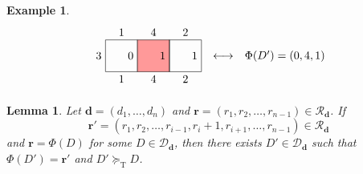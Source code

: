 \documentclass[10pt,a4paper]{amsart}
\newtheorem{lemma}{Lemma}
\newtheorem{example}{Example}
\newcommand{\geqt}{\succeq_{\text{T}}}
\begin{document}
\begin{example}
\[\begin{array}{ccc}
\begin{tikzpicture}[scale=.5]
      \draw (0,0) rectangle (2,2);
      \draw[fill=red!40!white] (2,0) rectangle (4,2);
      \draw (4,0) rectangle (6,2);
      \node at (1,2) [above] {$1$};
      \node at (3,2) [above] {$4$};
      \node at (5,2) [above] {$2$};
      \node at (1,0) [below] {$1$};
      \node at (3,0) [below] {$4$};
      \node at (5,0) [below] {$2$};
      \node at (0,1) [left]  {$3$};
      \node at (2,1) [left] {$0$};
      \node at (4,1) [left] {$1$};
      \node at (6,1) [left] {$1$};
    \end{tikzpicture} &  \raisebox{.34in}{$\longleftrightarrow$} & \raisebox{.34in}{$\Phi(D')=(0,4,1)$}\\
\end{array}\]
\end{example}

\begin{lemma}\label{lem:moving_up}
    Let $\mathbf{d}=(d_1,\hdots,d_n)$ and $\mathbf{r}=(r_1,r_2,\ldots,r_{n-1})\in \mathcal{R}_{\mathbf{d}}$. If \[\mathbf{r}'=(r_1,r_2,\ldots,r_{i-1},r_i+1,r_{i+1},\ldots,r_{n-1})\in \mathcal{R}_{\mathbf{d}}\] and $\mathbf{r}=\Phi(D)$ for some $D\in \mathcal{D}_{\mathbf{d}}$, then there exists $D'\in\mathcal{D}_{\mathbf{d}}$ such that $\Phi(D')=\mathbf{r}'$ and $D'\geqt D$.
\end{lemma}
\end{document}
